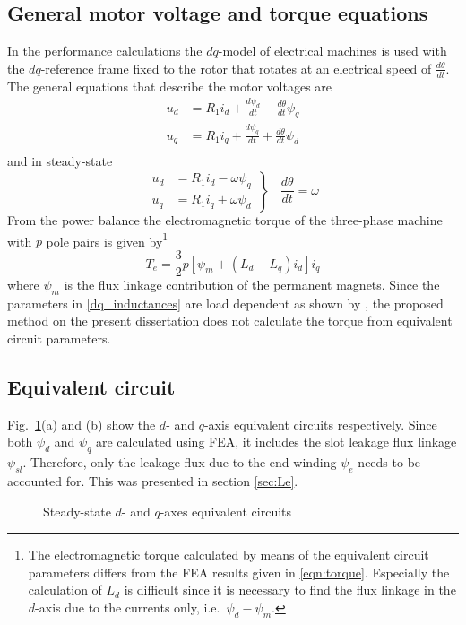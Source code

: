 \subsection{General motor voltage and torque equations}
In the performance calculations the $dq$-model of electrical machines is used with the $dq$-reference frame fixed to the rotor that rotates at an electrical speed of $\frac{d\theta}{dt}$. The general equations that describe the motor voltages are  
\begin{equation}\label{eqn_ud_2}
  \begin{aligned}
  u_d &= R_{1}i_{d} + \frac{d\psi_{d}}{dt} - \frac{d\theta}{dt} \psi_{q}\\
  u_q &= R_{1}i_{q} + \frac{d\psi_{q}}{dt} + \frac{d\theta}{dt} \psi_{d}\\
  \end{aligned}
\end{equation}
and in steady-state
\begin{equation}\label{eqn_ud_3}
  \left.
  \begin{aligned}
    u_d &= R_{1}i_{d} - \omega \psi_{q} \\
    u_q &= R_{1}i_{q} + \omega \psi_{d} 
  \end{aligned}
  \right\} 
  \quad
  \frac{d\theta}{dt}=\omega
\end{equation}
From the power balance the electromagnetic torque of the three-phase machine with $p$ pole pairs is given by\footnote{The electromagnetic torque calculated by means of the equivalent circuit parameters differs from the FEA results given in \eqref{eqn:torque}. Especially the calculation of $L_d$ is difficult since it is necessary to find the flux linkage in the $d$-axis due to the currents only, i.e.~$\psi_d-\psi_m$.}
\begin{equation}\label{dq_inductances}
  T_e = \frac{3}{2} p \left[ 
  \psi_{m} + \left(L_{d}- L_{q}\right) i_{d}
  \right]i_{q}
\end{equation}
where $\psi_{m}$ is the flux linkage contribution of the permanent magnets. Since the parameters in \eqref{dq_inductances} are load dependent as shown by \cite{reichert_2_2004}, the proposed method on the present dissertation does not calculate the torque from equivalent circuit parameters.

\subsection{Equivalent circuit}\label{subsec:eq_circ}
Fig.~\ref{fig:qd_axis_model}(a) and (b) show the $d$- and $q$-axis equivalent circuits respectively. Since both $\psi_d$ and $\psi_q$ are calculated using FEA, it includes the slot leakage flux linkage $\psi_{sl}$. Therefore, only the leakage flux due to the end winding $\psi_e$ needs to be accounted for. This was presented in section \ref{sec:Le}. 
\begin{figure}[htbp]
  \centering
    
    \caption{Steady-state $d$- and $q$-axes equivalent circuits}
    \label{fig:qd_axis_model}
\end{figure}

